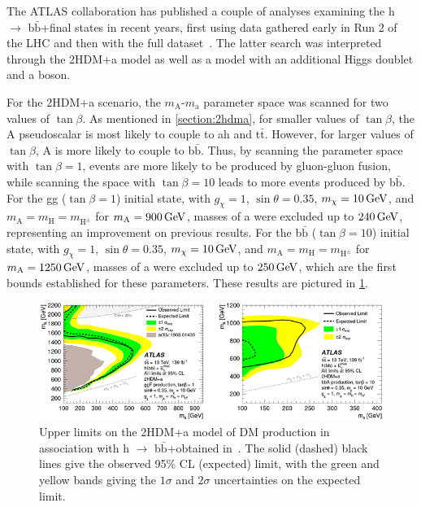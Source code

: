 The ATLAS collaboration has published a couple of analyses examining the h $\to$ b$\bar{\mathrm{b}}$+\ptmiss final states in recent years, first using data gathered early in Run 2 of the LHC and then with the full dataset~\cite{atlas:hbb2017,atlas:hbb2021}. The latter search was interpreted through the 2HDM+a model as well as a model with an additional Higgs doublet and a \Zp boson.

For the 2HDM+a scenario, the $m_\mathrm{A}$-$m_\mathrm{a}$ parameter space was scanned for two values of $\tan\beta$. As mentioned in \cref{section:2hdma}, for smaller values of $\tan\beta$, the A pseudoscalar is most likely to couple to ah and t$\bar{\mathrm{t}}$. However, for larger values of $\tan\beta$, A is more likely to couple to b$\bar{\mathrm{b}}$. Thus, by scanning the parameter space with $\tan\beta=1$, events are more likely to be produced by gluon-gluon fusion, while scanning the space with $\tan\beta=10$ leads to more events produced by b$\bar{\mathrm{b}}$. For the gg ($\tan\beta=1$) initial state, with $g_\chi = 1$, $\sin\theta=0.35$, $m_\chi=\GeV{10}$, and $m_\mathrm{A}=m_\mathrm{H}=m_{\mathrm{H}^\pm}$ for $m_\mathrm{A}=\GeV{900}$, masses of a were excluded up to $\GeV{240}$, representing an improvement on previous results. For the b$\bar{\mathrm{b}}$ ($\tan\beta=10$) initial state, with $g_\chi = 1$, $\sin\theta=0.35$, $m_\chi=\GeV{10}$, and $m_\mathrm{A}=m_\mathrm{H}=m_{\mathrm{H}^\pm}$ for $m_\mathrm{A}=\GeV{1250}$, masses of a were excluded up to $\GeV{250}$, which are the first bounds established for these parameters. These results are pictured in \cref{fig:hbbmet20211}.

\begin{figure}[ht]
\centering
\includegraphics[width=\textwidth]{Chapters/Experiment/2021hbbmet_results.png}
\caption{Upper limits on the 2HDM+a model of DM production in association with h $\to$ b$\bar{\mathrm{b}}$+\ptmiss obtained in~\cite{atlas:hbb2021}. The solid (dashed) black lines give the observed 95\% CL (expected) limit, with the green and yellow bands giving the $1\sigma$ and $2\sigma$ uncertainties on the expected limit.}
\label{fig:hbbmet20211}
\end{figure}

